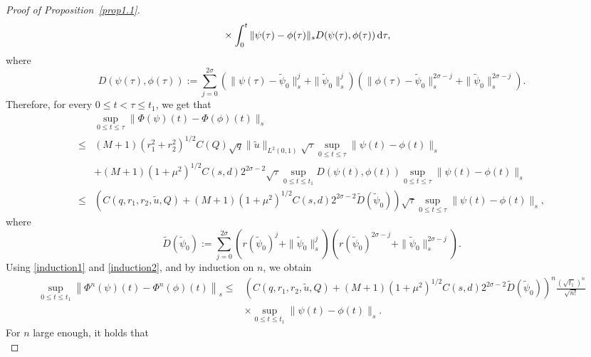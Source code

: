 \documentclass[review]{elsarticle}
\theoremstyle{dotless}
\def\d{{\,\rm d}}
\def \leq{\leqslant}
\numberwithin{equation}{section}
\begin{document}
\begin{proof}[Proof of Proposition~\ref{prop1.1}]
\begin{equation}
\begin{aligned}
			& \times \int_0^t\|\psi(\tau)-\phi(\tau)\|_{s} D(\psi(\tau), \phi(\tau))\d \tau,
		\end{aligned}
	\end{equation}
	where
	\begin{equation*}
		D(\psi(\tau), \phi(\tau)):=\sum_{j=0}^{2\sigma}\left( \|\psi(\tau)-\tilde{\psi}_0 \|_{s}^j+ \|\tilde{\psi}_0 \|_{s}^j\right)\left( \|\phi(\tau)-\tilde{\psi}_0 \|_{s}^{2\sigma-j}+ \|\tilde{\psi}_0 \|_{s}^{2\sigma-j}\right).
	\end{equation*}
	Therefore, for every $0\leq t<\tau\leq t_1$, we get that 
	\begin{equation}\label{induction2}
		\begin{aligned}
			&\sup _{0 \leq t \leq \tau}\|\Phi(\psi)(t)-\Phi(\phi)(t)\|_{s}\\ \leq &(M+1) (r_1^2+r_2^2)^{1/2}C(Q) \sqrt{ q}\|\tilde{u}\|_{L^2(0,1)} \sqrt{\tau} \sup _{0 \leq t \leq \tau}\|\psi(t)-\phi(t)\|_{s} \\
			& +(M+1)(1+\mu^2)^{1/2}C\left(s,d\right) 2^{2\sigma-2} \sqrt{\tau} \sup _{0 \leq t \leq t_1} D(\psi(t), \phi(t)) \sup _{0 \leq t \leq \tau}\|\psi(t)-\phi(t)\|_{s} \\
			\leq & \left(C(q,r_1,r_2, \tilde{u}, Q)+(M+1)(1+\mu^2)^{1/2}C\left(s,d\right) 2^{2\sigma-2}\tilde{D} (\tilde{\psi}_0 )\right) \sqrt{\tau} \sup _{0 \leq t \leq \tau}\|\psi(t)-\phi(t)\|_{s},
		\end{aligned}
	\end{equation}
	where
	\begin{equation*}
		\tilde{D} (\tilde{\psi}_0 ):=\sum_{j=0}^{2\sigma}\left(r (\tilde{\psi}_0 )^j+ \|\tilde{\psi}_0 \|_{s}^j\right)\left(r (\tilde{\psi}_0 )^{2\sigma-j}+ \|\tilde{\psi}_0 \|_{s}^{2\sigma-j}\right).
	\end{equation*}
	Using \eqref{induction1} and \eqref{induction2}, and by induction on $ n $, we obtain
	\begin{equation*}
		\begin{aligned}
			\sup _{0 \leq t \leq t_1}\left\|\Phi^n(\psi)(t)-\Phi^n(\phi)(t)\right\|_{s} \leq&\left(C(q,r_1,r_2, \tilde{u}, Q)+(M+1)(1+\mu^2)^{1/2}C\left(s,d\right) 2^{2\sigma-2}\tilde{D} (\tilde{\psi}_0 )\right)^n \frac{\left(\sqrt{t_1}\right)^n}{\sqrt{n!}} \\ 
			&\times\sup _{0 \leq t \leq t_1}\|\psi(t)-\phi(t)\|_{s}.
		\end{aligned}
	\end{equation*}
	For $ n $ large enough, it holds that 
	\begin{equation*}

\end{equation*}
\end{proof}
\end{document}
